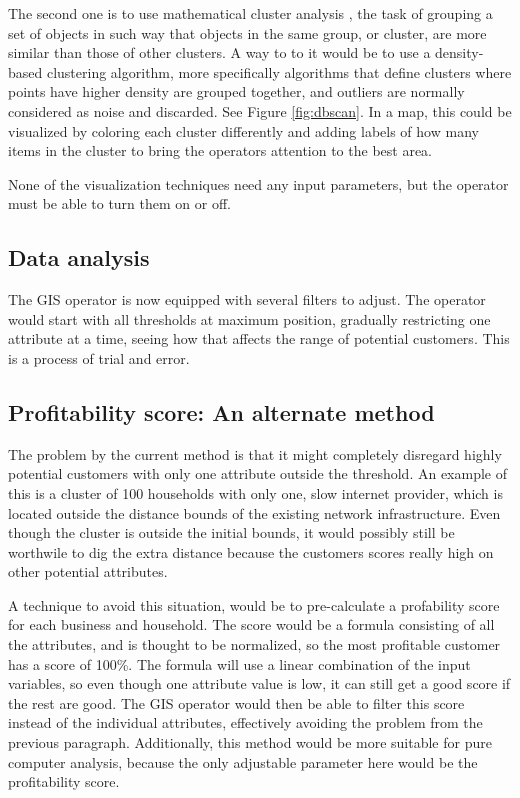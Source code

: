 \documentclass[twocolumn]{article}
\begin{document}
The second one is to use mathematical cluster analysis \cite{Wikipedia_contributors2014-qv}, the task of grouping a set of objects in such way that objects in the same group, or cluster, are more similar than those of other clusters. A way to to it would be to use a density-based clustering algorithm, more specifically algorithms that define clusters where points have higher density are grouped together, and outliers are normally considered as noise and discarded. See Figure \ref{fig:dbscan}. In a map, this could be visualized by coloring each cluster differently and adding labels of how many items in the cluster to bring the operators attention to the best area.

None of the visualization techniques need any input parameters, but the operator must be able to turn them on or off.

\subsection{Data analysis}
\label{sub:Data analysis}
The GIS operator is now equipped with several filters to adjust. The operator would start with all thresholds at maximum position, gradually restricting one attribute at a time, seeing how that affects the range of potential customers. This is a process of trial and error.


\subsection{Profitability score: An alternate method}
\label{sub:Profitability score: An alternate method}
The problem by the current method is that it might completely disregard highly potential customers with only one attribute outside the threshold. An example of this is a cluster of 100 households with only one, slow internet provider, which is located outside the distance bounds of the existing network infrastructure. Even though the cluster is outside the initial bounds, it would possibly still be worthwile to dig the extra distance because the customers scores really high on other potential attributes.

A technique to avoid this situation, would be to pre-calculate a profability score for each business and household. The score would be a formula consisting of all the attributes, and is thought to be normalized, so the most profitable customer has a score of 100\%. The formula will use a linear combination of the input variables, so even though one attribute value is low, it can still get a good score if the rest are good. The GIS operator would then be able to filter this score instead of the individual attributes, effectively avoiding the problem from the previous paragraph. Additionally, this method would be more suitable for pure computer analysis, because the only adjustable parameter here would be the profitability score.
\end{document}
